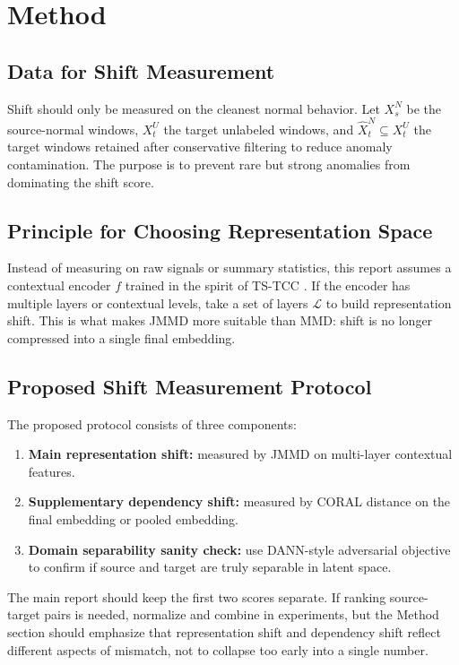 \documentclass[a4paper]{article}
\begin{document}
\section{Method}

\subsection{Data for Shift Measurement}

Shift should only be measured on the cleanest normal behavior. Let \(X_s^N\) be the source-normal windows, \(X_t^U\) the target unlabeled windows, and \(\widehat{X}_t^N \subseteq X_t^U\) the target windows retained after conservative filtering to reduce anomaly contamination. The purpose is to prevent rare but strong anomalies from dominating the shift score.

\subsection{Principle for Choosing Representation Space}

Instead of measuring on raw signals or summary statistics, this report assumes a contextual encoder \(f\) trained in the spirit of TS-TCC \cite{tstcc}. If the encoder has multiple layers or contextual levels, take a set of layers \(\mathcal{L}\) to build representation shift. This is what makes JMMD more suitable than MMD: shift is no longer compressed into a single final embedding.

\subsection{Proposed Shift Measurement Protocol}

The proposed protocol consists of three components:
\begin{enumerate}[label=\arabic*.]
    \item \textbf{Main representation shift:} measured by JMMD on multi-layer contextual features.
    \item \textbf{Supplementary dependency shift:} measured by CORAL distance on the final embedding or pooled embedding.
    \item \textbf{Domain separability sanity check:} use DANN-style adversarial objective to confirm if source and target are truly separable in latent space.
\end{enumerate}

The main report should keep the first two scores separate. If ranking source-target pairs is needed, normalize and combine in experiments, but the Method section should emphasize that representation shift and dependency shift reflect different aspects of mismatch, not to collapse too early into a single number.
\end{document}
